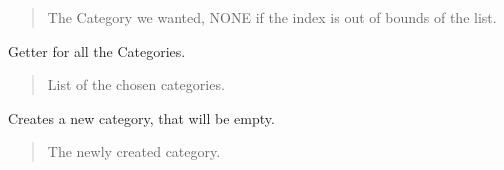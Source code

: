 \documentclass[letterpaper,10pt,english]{sphinxmanual}
\begin{document}
\begin{fulllineitems}
\begin{fulllineitems}
\begin{quote}
\begin{description}
\sphinxAtStartPar
The Category we wanted, NONE if the index is out of bounds of the list.

\sphinxAtStartPar
{\hyperref[\detokenize{apidoc/src.osm_configurator.model.project.configuration:src.osm_configurator.model.project.configuration.category.Category}]{}}

\end{description}\end{quote}

\end{fulllineitems}


\begin{fulllineitems}
\label{\detokenize{apidoc/src.osm_configurator.model.application:src.osm_configurator.model.application.application.Application.get_categories}}
\pysigstartsignatures
{}
\pysigstopsignatures
\sphinxAtStartPar
Getter for all the Categories.
\begin{quote}\begin{description}
\sphinxAtStartPar
List of the chosen categories.

\sphinxAtStartPar
{}

\end{description}\end{quote}

\end{fulllineitems}


\begin{fulllineitems}
\label{\detokenize{apidoc/src.osm_configurator.model.application:src.osm_configurator.model.application.application.Application.create_category}}
\pysigstartsignatures
{}
\pysigstopsignatures
\sphinxAtStartPar
Creates a new category, that will be empty.
\begin{quote}\begin{description}
\sphinxAtStartPar
The newly created category.


\end{description}
\end{quote}
\end{fulllineitems}
\end{fulllineitems}
\end{document}
